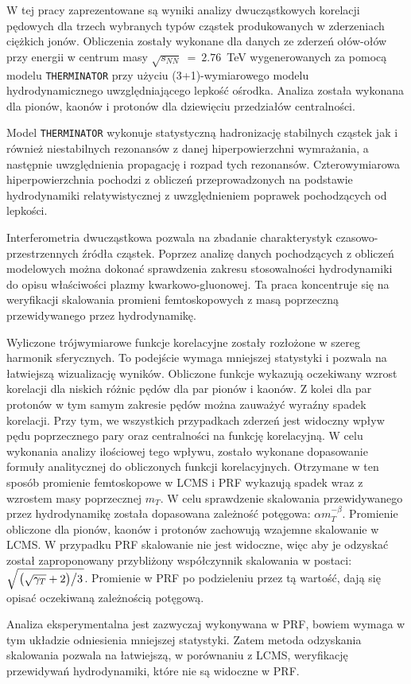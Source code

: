 
W tej pracy zaprezentowane są wyniki analizy dwucząstkowych korelacji pędowych dla trzech wybranych typów cząstek produkowanych w zderzeniach ciężkich jonów.
Obliczenia zostały wykonane dla danych ze zderzeń ołów-ołów przy energii w centrum masy $\sqrt{s_{NN}}~=~2.76$~TeV wygenerowanych za pomocą modelu \verb|THERMINATOR| przy użyciu (3+1)-wymiarowego modelu hydrodynamicznego uwzględniającego lepkość ośrodka.
Analiza została wykonana dla pionów, kaonów i protonów dla dziewięciu przedziałów centralności.

Model \verb|THERMINATOR| wykonuje statystyczną hadronizację stabilnych cząstek jak i również niestabilnych rezonansów z danej hiperpowierzchni wymrażania, a następnie uwzględnienia propagację i rozpad tych rezonansów.
Czterowymiarowa hiperpowierzchnia pochodzi z obliczeń przeprowadzonych na podstawie hydrodynamiki relatywistycznej z uwzględnieniem poprawek pochodzących od lepkości.

Interferometria dwucząstkowa pozwala na zbadanie charakterystyk czasowo-przestrzennych źródła cząstek.
Poprzez analizę danych pochodzących z obliczeń modelowych można dokonać sprawdzenia zakresu stosowalności hydrodynamiki do opisu właściwości plazmy kwarkowo-gluonowej.
Ta praca koncentruje się na weryfikacji skalowania promieni femtoskopowych z masą poprzeczną przewidywanego przez hydrodynamikę.

Wyliczone trójwymiarowe funkcje korelacyjne zostały rozłożone w szereg harmonik sferycznych.
To podejście wymaga mniejszej statystyki i pozwala na łatwiejszą wizualizację wyników.
Obliczone funkcje wykazują oczekiwany wzrost korelacji dla niskich różnic pędów dla par pionów i kaonów.
Z kolei dla par protonów w tym samym zakresie pędów można zauważyć wyraźny spadek korelacji.
Przy tym, we wszystkich przypadkach zderzeń jest widoczny wpływ pędu poprzecznego pary oraz centralności na funkcję korelacyjną.
W celu wykonania analizy ilościowej tego wpływu, zostało wykonane dopasowanie formuły analitycznej do obliczonych funkcji korelacyjnych.
Otrzymane w ten sposób promienie femtoskopowe w LCMS i PRF wykazują spadek wraz z wzrostem masy poprzecznej $m_T$.
W celu sprawdzenie skalowania przewidywanego przez hydrodynamikę została dopasowana zależność potęgowa: $\alpha m_T^{-\beta}$.
Promienie obliczone dla pionów, kaonów i protonów zachowują wzajemne skalowanie w LCMS.
W przypadku PRF skalowanie nie jest widoczne, więc aby je odzyskać został zaproponowany przybliżony współczynnik skalowania w postaci: $\sqrt{ \left. \left( \sqrt{\gamma_T} + 2 \right) \middle/ 3 \right. }$.
Promienie w PRF po podzieleniu przez tą wartość, dają się opisać oczekiwaną zależnością potęgową.

Analiza eksperymentalna jest zazwyczaj wykonywana w PRF, bowiem wymaga w tym układzie odniesienia mniejszej statystyki.
Zatem metoda odzyskania skalowania pozwala na łatwiejszą, w porównaniu z LCMS, weryfikację przewidywań hydrodynamiki, które nie są widoczne w PRF.